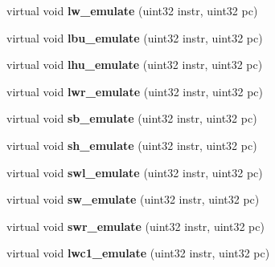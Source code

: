 \begin{DoxyCompactItemize}
\item 
\hypertarget{classCPU_a0257d77024421e4c682789a1e981de02}{
virtual void {\bfseries lw\_\-emulate} (uint32 instr, uint32 pc)}
\label{classCPU_a0257d77024421e4c682789a1e981de02}

\item 
\hypertarget{classCPU_a784f872d9934535f849ca5533e6d2344}{
virtual void {\bfseries lbu\_\-emulate} (uint32 instr, uint32 pc)}
\label{classCPU_a784f872d9934535f849ca5533e6d2344}

\item 
\hypertarget{classCPU_a4fee10b21105794779b58964d69788bc}{
virtual void {\bfseries lhu\_\-emulate} (uint32 instr, uint32 pc)}
\label{classCPU_a4fee10b21105794779b58964d69788bc}

\item 
\hypertarget{classCPU_ae7a86c3813087678b5fef55d4b976400}{
virtual void {\bfseries lwr\_\-emulate} (uint32 instr, uint32 pc)}
\label{classCPU_ae7a86c3813087678b5fef55d4b976400}

\item 
\hypertarget{classCPU_a6399b7217b5d74860e5e815b0f36ec45}{
virtual void {\bfseries sb\_\-emulate} (uint32 instr, uint32 pc)}
\label{classCPU_a6399b7217b5d74860e5e815b0f36ec45}

\item 
\hypertarget{classCPU_afcdf6fb7c204c83a587efddbf16dea2e}{
virtual void {\bfseries sh\_\-emulate} (uint32 instr, uint32 pc)}
\label{classCPU_afcdf6fb7c204c83a587efddbf16dea2e}

\item 
\hypertarget{classCPU_ad6e88cf043663ae4d8e72e3bc16ba52d}{
virtual void {\bfseries swl\_\-emulate} (uint32 instr, uint32 pc)}
\label{classCPU_ad6e88cf043663ae4d8e72e3bc16ba52d}

\item 
\hypertarget{classCPU_a4360afbe04f87387ad1d43f7904548da}{
virtual void {\bfseries sw\_\-emulate} (uint32 instr, uint32 pc)}
\label{classCPU_a4360afbe04f87387ad1d43f7904548da}

\item 
\hypertarget{classCPU_a6c8501261f20dbfd3d1b62c63ab8b75b}{
virtual void {\bfseries swr\_\-emulate} (uint32 instr, uint32 pc)}
\label{classCPU_a6c8501261f20dbfd3d1b62c63ab8b75b}

\item 
\hypertarget{classCPU_acc036fc3519f4f57491748a374ea53a4}{
virtual void {\bfseries lwc1\_\-emulate} (uint32 instr, uint32 pc)}
\label{classCPU_acc036fc3519f4f57491748a374ea53a4}


\end{DoxyCompactItemize}
